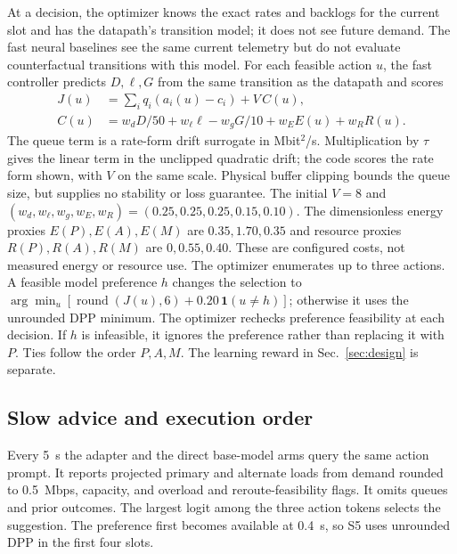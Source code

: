 \documentclass[conference]{IEEEtran}
\begin{document}
At a decision, the optimizer knows the exact rates and backlogs for the current slot and has the datapath's transition model; it does not see future demand. The fast neural baselines see the same current telemetry but do not evaluate counterfactual transitions with this model. For each feasible action \(u\), the fast controller predicts \(D,\ell,G\) from the same transition as the datapath and scores
\begin{align}
J(u) &= \sum_i q_i(a_i(u)-c_i)+V\,C(u), \label{eq:score}\\
C(u) &= w_d D/50+w_\ell\ell-w_gG/10
        +w_E E(u)+w_R R(u).
\end{align}
The queue term is a rate-form drift surrogate in Mbit\({}^2\)/s. Multiplication by \(\tau\) gives the linear term in the unclipped quadratic drift; the code scores the rate form shown, with \(V\) on the same scale. Physical buffer clipping bounds the queue size, but supplies no stability or loss guarantee. The initial \(V=8\) and \((w_d,w_\ell,w_g,w_E,w_R)=(0.25,0.25,0.25,0.15,0.10)\). The dimensionless energy proxies \(E(P),E(A),E(M)\) are \(0.35,1.70,0.35\) and resource proxies \(R(P),R(A),R(M)\) are \(0,0.55,0.40\). These are configured costs, not measured energy or resource use. The optimizer enumerates up to three actions. A feasible model preference \(h\) changes the selection to \(\arg\min_u[\operatorname{round}(J(u),6)+0.20\,\mathbf{1}(u\ne h)]\); otherwise it uses the unrounded DPP minimum. The optimizer rechecks preference feasibility at each decision. If \(h\) is infeasible, it ignores the preference rather than replacing it with \(P\). Ties follow the order \(P,A,M\). The learning reward in Sec.~\ref{sec:design} is separate.

\subsection{Slow advice and execution order}
Every 5~s the adapter and the direct base-model arms query the same action prompt. It reports projected primary and alternate loads from demand rounded to 0.5~Mbps, capacity, and overload and reroute-feasibility flags. It omits queues and prior outcomes. The largest logit among the three action tokens selects the suggestion. The preference first becomes available at 0.4~s, so S5 uses unrounded DPP in the first four slots.
\end{document}
